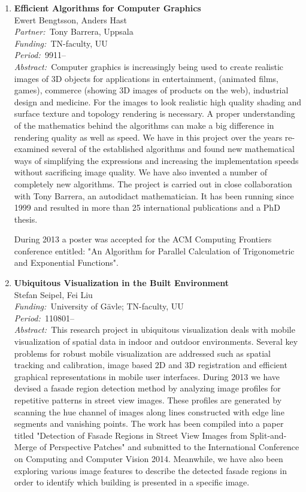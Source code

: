 \documentclass[10pt, a4paper]{article}
\newcommand{\aabstract}[1]{\emph{Abstract:~}#1}
\newcommand{\ffunding}[1]{\emph{Funding:~}#1\\}
\newcommand{\ppartner}[1]{\emph{Partner:~}#1\\}
\newcommand{\pperiod}[1]{\emph{Period:~}#1\\}
\begin{document}
\begin{enumerate}
\item \textbf{Efficient Algorithms for Computer Graphics}\\
Ewert Bengtsson, Anders Hast \\
\ppartner{Tony Barrera, Uppsala}
\ffunding{TN-faculty, UU}
\pperiod{9911--}
\aabstract{Computer graphics is increasingly being used to create realistic images of 3D objects for applications in entertainment, (animated films, games), commerce (showing 3D images of products on the web), industrial design and medicine. For the images to look realistic high quality shading and surface texture and topology rendering is necessary. A proper understanding of the mathematics behind the algorithms can make a big difference in rendering quality as well as speed. We have in this project over the years re-examined several of the established algorithms and found new mathematical ways of simplifying the expressions and increasing the implementation speeds without sacrificing image quality. We have also invented a number of completely new algorithms. The project is carried out in close collaboration with Tony Barrera, an autodidact mathematician. It has been running since 1999 and resulted in more than 25 international publications and a PhD thesis.

During 2013 a poster was accepted for the ACM Computing Frontiers conference entitled: "An Algorithm for Parallel Calculation of Trigonometric and Exponential Functions".}


\item \textbf{Ubiquitous Visualization in the Built Environment}\\
Stefan Seipel, Fei Liu\\
\ffunding{University of G\"{a}vle; TN-faculty, UU}
\pperiod{110801--}%
\aabstract{This research project in ubiquitous visualization deals with mobile visualization of spatial data in indoor and outdoor environments. Several key problems for robust mobile visualization are addressed such as spatial tracking and calibration, image based 2D and 3D registration and efficient graphical representations in mobile user interfaces. During 2013 we have devised a fasade region detection method by analyzing image profiles for repetitive patterns in street view images. These profiles are generated by scanning the hue channel of images along lines constructed with edge line segments and vanishing points. The work has been compiled into a paper titled "Detection of Fasade Regions in Street View Images from Split-and-Merge of Perspective Patches" and submitted to the International Conference on Computing and Computer Vision 2014. Meanwhile, we have also been exploring various image features to describe the detected fasade regions in order to identify which building is presented in a specific image.}


\end{enumerate}
\end{document}
